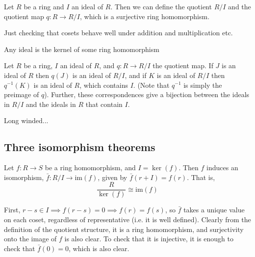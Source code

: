 \documentclass{maths}
\begin{document}
\begin{thm}
    Let $R$ be a ring and $I$ an ideal of $R$.
    Then we can define the quotient $R/I$ and the quotient map $q\colon R\to R/I$, which is a surjective ring homomorphism.
\end{thm}
\begin{prf}
    Just checking that cosets behave well under addition and multiplication etc.
\end{prf}

\begin{cor}
    Any ideal is the kernel of some ring homomorphism
\end{cor}

\begin{lem}
    Let $R$ be a ring, $I$ an ideal of $R$, and $q\colon R\to R/I$ the quotient map.
    If $J$ is an ideal of $R$ then $q(J)$ is an ideal of $R/I$, and if $K$ is an ideal of $R/I$ then $q^{-1}(K)$ is an ideal of $R$, which contains $I$.
    (Note that $q^{-1}$ is simply the preimage of $q$).
    Further, these correspondences give a bijection between the ideals in $R/I$ and the ideals in $R$ that contain $I$.
\end{lem}
\begin{prf}
    Long winded...
\end{prf}

\subsection{Three isomorphism theorems}

\begin{thm}
    Let $f\colon R\to S$ be a ring homomorphism, and $I=\ker(f)$.
    Then $f$ induces an isomorphism, $\bar{f}\colon R/I\to\mathrm{im}(f)$, given by $\bar{f}(r+I)=f(r)$.
    That is,
    \[
        \frac{R}{\ker(f)} \cong
        \mathrm{im}(f)
    \]
\end{thm}

\begin{prf}
    First, $r-s\in I\implies f(r-s)=0\implies f(r)=f(s)$, so $\bar{f}$ takes a unique value on each coset, regardless of representative (i.e. it is well defined).
    Clearly from the definition of the quotient structure, it is a ring homomorphism, and surjectivity onto the image of $f$ is also clear.
    To check that it is injective, it is enough to check that $\bar{f}(0)=0$, which is also clear.
\end{prf}
\end{document}
